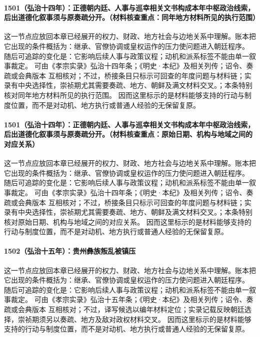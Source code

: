 \paragraph{1501（弘治十四年）：正德朝内廷、人事与巡幸相关文书构成本年中枢政治线索，后出道德化叙事须与原奏疏分开。（材料核查重点：同年地方材料所见的执行范围）} 这一节点应放回本章已经展开的权力、财政、地方社会与边地关系中理解。账本把它出现的条件概括为：继承、官僚协调或皇权运作的压力使问题进入朝廷程序。 随后可追踪的变化是：它影响后续人事与政策议程；动机和派系标签不能由单一叙事裁定。 可由《孝宗实录》弘治十四年条；《明史·本纪》及相关列传；诏令、奏疏或会典版本 互相核对；不过，桥接条目只标示可回查的年度问题与材料链；实录有中央选择性，崇祯期尤其需要奏疏、地方、朝鲜及满文材料交叉。；本条特别核对同年地方材料所见的执行范围。 因而这里标示的是材料能够支持的行动与制度位置，而不是对动机、地方执行或普通人经验的无保留复原。

\paragraph{1501（弘治十四年）：正德朝内廷、人事与巡幸相关文书构成本年中枢政治线索，后出道德化叙事须与原奏疏分开。（材料核查重点：原始日期、机构与地域之间的对应关系）} 这一节点应放回本章已经展开的权力、财政、地方社会与边地关系中理解。账本把它出现的条件概括为：继承、官僚协调或皇权运作的压力使问题进入朝廷程序。 随后可追踪的变化是：它影响后续人事与政策议程；动机和派系标签不能由单一叙事裁定。 可由《孝宗实录》弘治十四年条；《明史·本纪》及相关列传；诏令、奏疏或会典版本 互相核对；不过，桥接条目只标示可回查的年度问题与材料链；实录有中央选择性，崇祯期尤其需要奏疏、地方、朝鲜及满文材料交叉。；本条特别核对原始日期、机构与地域之间的对应关系。 因而这里标示的是材料能够支持的行动与制度位置，而不是对动机、地方执行或普通人经验的无保留复原。

\paragraph{1502（弘治十五年）：贵州彝族叛乱被镇压} 这一节点应放回本章已经展开的权力、财政、地方社会与边地关系中理解。账本把它出现的条件概括为：继承、官僚协调或皇权运作的压力使问题进入朝廷程序。 随后可追踪的变化是：它影响后续人事与政策议程；动机和派系标签不能由单一叙事裁定。 可由《孝宗实录》弘治十五年条；《明史·本纪》及相关列传；诏令、奏疏或会典版本 互相核对；不过，译写候选以编年材料定位；实录记载反映朝廷选择，崇祯期须另以奏疏、地方及敌对政权材料交叉。 因而这里标示的是材料能够支持的行动与制度位置，而不是对动机、地方执行或普通人经验的无保留复原。

